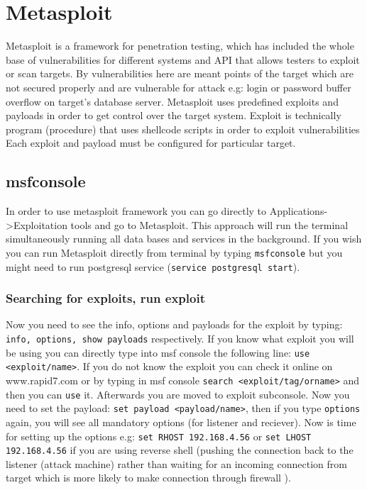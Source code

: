\documentclass{article}[12pt]
\begin{document}

\section{Metasploit}
Metasploit is a framework for penetration testing, which has included the whole base of vulnerabilities for different systems and API that allows testers to exploit or scan targets.
By vulnerabilities here are meant points of the target which are not secured properly and are vulnerable for attack e.g:
login or password buffer overflow on target's database server.
Metasploit uses predefined exploits and payloads in order to get control over the target system.
Exploit is technically program (procedure) that uses shellcode scripts in order to exploit vulnerabilities Each exploit and payload must be configured for particular target.




\subsection{msfconsole}
In order to use metasploit framework you can go directly to Applications->Exploitation tools and go to Metasploit.
This approach will run the terminal simultaneously running all
data bases and services in the background.
If you wish you can run Metasploit directly from terminal by typing \texttt{msfconsole} but you might need to run postgresql service (\texttt{service postgresql start}).

\subsubsection{Searching for exploits, run exploit}

Now you need to see the info, options and payloads for the exploit by typing: \texttt{info, options, show payloads} respectively.
If you know what exploit you will be using you can directly type into msf console the following line:
\texttt{use <exploit/name>}.
If you do not know the exploit you can check it online on www.rapid7.com
or by typing in msf console \texttt{search <exploit/tag/orname>} and then you can \texttt{use} it.
Afterwards you are moved to exploit subconsole.
Now you need to set the payload: \texttt{set payload <payload/name>},
then if you type \texttt{options} again, you will see all mandatory options (for listener and reciever).
Now is time for setting up the options e.g: \texttt{set RHOST 192.168.4.56} or \texttt{set LHOST 192.168.4.56}
if you are using reverse shell (pushing the connection back to the listener (attack machine) rather than
waiting for an incoming connection from target which is more likely to make connection through firewall \cite{pen}).
\end{document}
